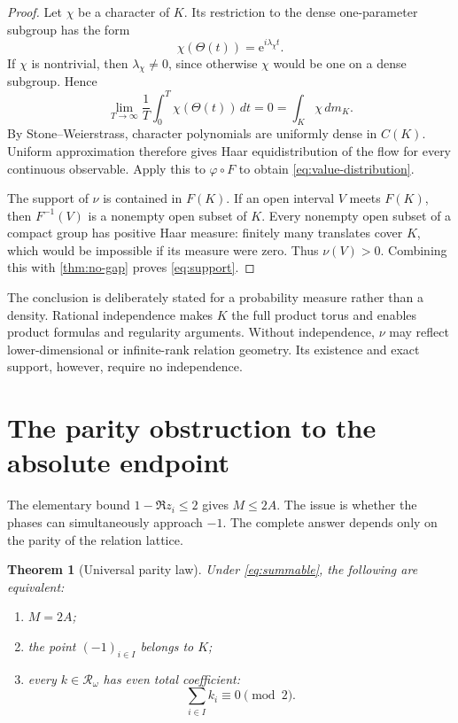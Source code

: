 \documentclass[11pt]{article}
\newtheorem{theorem}{Theorem}[section]
\theoremstyle{remark}
\newcommand{\e}{\mathrm e}
\newcommand{\Rel}{\mathcal R}
\begin{document}
\begin{proof}
Let $\chi$ be a character of $K$.  Its restriction to the dense one-parameter subgroup has the
form
\[
 \chi(\Theta(t))=\e^{i\lambda_\chi t}.
\]
If $\chi$ is nontrivial, then $\lambda_\chi\ne0$, since otherwise $\chi$ would be one on a dense
subgroup.  Hence
\[
 \lim_{T\to\infty}\frac1T\int_0^T\chi(\Theta(t))\,dt=0
 =\int_K\chi\,dm_K.
\]
By Stone--Weierstrass, character polynomials are uniformly dense in $C(K)$.  Uniform approximation
therefore gives Haar equidistribution of the flow for every continuous observable.  Apply this to
$\varphi\circ F$ to obtain \eqref{eq:value-distribution}.

The support of $\nu$ is contained in $F(K)$.  If an open interval $V$ meets $F(K)$, then
$F^{-1}(V)$ is a nonempty open subset of $K$.  Every nonempty open subset of a compact group has
positive Haar measure: finitely many translates cover $K$, which would be impossible if its
measure were zero.  Thus $\nu(V)>0$.  Combining this with \cref{thm:no-gap} proves
\eqref{eq:support}.
\end{proof}

The conclusion is deliberately stated for a probability measure rather than a density.  Rational
independence makes $K$ the full product torus and enables product formulas and regularity arguments.
Without independence, $\nu$ may reflect lower-dimensional or infinite-rank relation geometry.  Its
existence and exact support, however, require no independence.

\section{The parity obstruction to the absolute endpoint}

The elementary bound $1-\Re z_i\leq2$ gives $M\leq2A$.  The issue is whether the phases can
simultaneously approach $-1$.  The complete answer depends only on the parity of the relation
lattice.

\begin{theorem}[Universal parity law]\label{thm:parity}
Under \eqref{eq:summable}, the following are equivalent:
\begin{enumerate}
 \item $M=2A$;
 \item the point $(-1)_{i\in I}$ belongs to $K$;
 \item every $k\in\Rel_\omega$ has even total coefficient:
 \begin{equation}\label{eq:even-relation}
    \sum_{i\in I}k_i\equiv0\pmod 2.
 \end{equation}
\end{enumerate}
\end{theorem}
\end{document}
